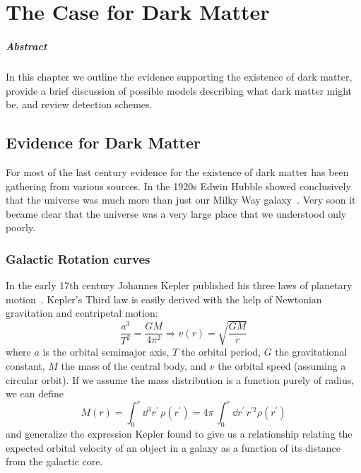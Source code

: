 
\chapter{The Case for Dark Matter}

\paragraph{Abstract} In this chapter we outline the evidence supporting the existence of dark matter, provide a brief discussion of possible models describing what dark matter might be, and review detection schemes.

\section{Evidence for Dark Matter}

For most of the last century evidence for the existence of dark matter has been gathering from various sources. In the 1920s Edwin Hubble showed conclusively that the universe was much more than just our Milky Way galaxy~\cite{Hubble:1929}. Very soon it became clear that the universe was a very large place that we understood only poorly.

\subsection{Galactic Rotation curves}

In the early 17th century Johannes Kepler published his three laws of planetary motion~\cite{Kepler}. Kepler's Third law is easily derived with the help of Newtonian gravitation and centripetal motion:
\begin{equation} \label{eq:rotation_curve}
\frac{a^3}{T^2} = \frac{GM}{4\pi^2} \Longrightarrow v(r) = \sqrt{\frac{GM}{r}}
\end{equation}
where $a$ is the orbital semimajor axis, $T$ the orbital period, $G$ the gravitational constant, $M$ the mass of the central body, and $v$ the orbital speed (assuming a circular orbit). If we assume the mass distribution is a function purely of radius, we can define
\begin{equation} \label{eq:mass_distribution}
M(r) = \int_0^r \dd^3r^{\prime}\, \rho (r^{\prime}) = 4\pi\,\int_0^r \dd r^{\prime}\, r^{\prime 2} \rho(r^{\prime})
\end{equation}
and generalize the expression Kepler found to give us a relationship relating the expected orbital velocity of an object in a galaxy as a function of its distance from the galactic core.

